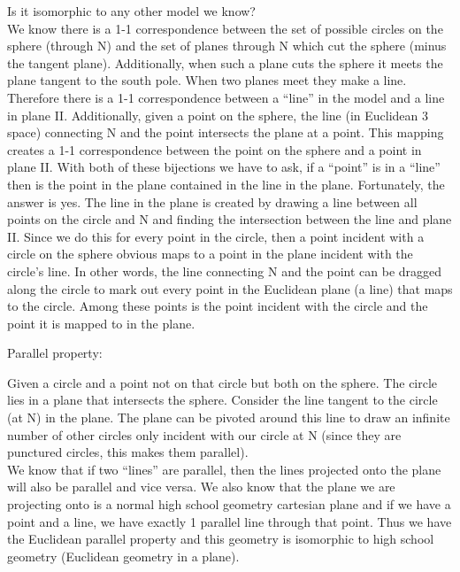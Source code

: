\documentclass[12pt,letterpaper]{article}
\begin{document}
Is it isomorphic to any other model we know?\\


We know there is a 1-1 correspondence between the set of possible circles on the sphere (through N) and the set of planes through N which cut the sphere (minus the tangent plane).  Additionally, when such a plane cuts the sphere it meets the plane tangent to the south pole.  When two planes meet they make a line.  Therefore there is a 1-1 correspondence between a ``line'' in the model and a line in plane II. Additionally, given a point on the sphere, the line (in Euclidean 3 space) connecting N and the point intersects the plane at a point. This mapping creates a 1-1 correspondence between the point on the sphere and a point in plane II.  With both of these bijections we have to ask, if a ``point'' is in a ``line'' then is the point in the plane contained in the line in the plane.  Fortunately, the answer is yes.  The line in the plane is created by drawing a line between all points on the circle and N and finding the intersection between the line and plane II.  Since we do this for every point in the circle, then a point incident with a circle on the sphere obvious maps to a point in the plane incident with the circle's line. In other words, the line connecting N and the point can be dragged along the circle to mark out every point in the Euclidean plane (a line) that maps to the circle.  Among these points is the point incident with the circle and the point it is mapped to in the plane.


 
Parallel property:

Given a circle and a point not on that circle but both on the sphere.  The circle lies in a plane that intersects the sphere.  Consider the line tangent to the circle (at N) in the plane.  The plane can be pivoted around this line to draw an infinite number of other circles only incident with our circle at N (since they are punctured circles, this makes them parallel).\\

We know that if two ``lines'' are parallel, then the lines projected onto the plane will also be parallel and vice versa.  We also know that the plane we are projecting onto is a normal high school geometry cartesian plane and if we have a point and a line, we have exactly 1 parallel line through that point.  Thus we have the Euclidean parallel property and this geometry is isomorphic to high school geometry (Euclidean geometry in a plane).
\end{document}
